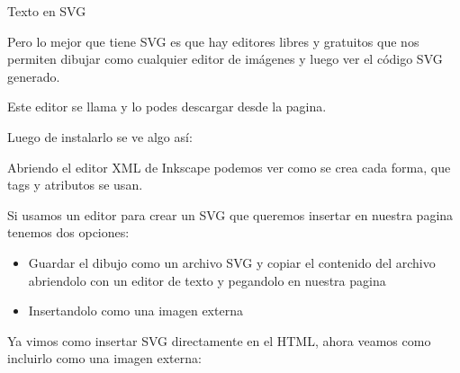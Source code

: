 \documentclass[letterpaper,10pt,spanish]{sphinxmanual}
\begin{document}
\begin{sphinxVerbatim}[commandchars=\\\{\}]
        Texto en SVG
\end{sphinxVerbatim}



Pero lo mejor que tiene SVG es que hay editores libres y gratuitos que nos
permiten dibujar como cualquier editor de imágenes y luego ver el código SVG
generado.

Este editor se llama  y lo podes
descargar desde la pagina.

Luego de instalarlo se ve algo así:

\begin{figure}[htbp]
\centering

\noindent{}
\end{figure}

Abriendo el editor XML de Inkscape podemos ver como se crea cada forma, que
tags y atributos se usan.

\begin{figure}[htbp]
\centering

\noindent{}
\end{figure}

Si usamos un editor para crear un SVG que queremos insertar en nuestra pagina
tenemos dos opciones:
\begin{itemize}
\item {} 
Guardar el dibujo como un archivo SVG y copiar el contenido del archivo abriendolo con un editor de texto y pegandolo en nuestra pagina

\item {} 
Insertandolo como una imagen externa

\end{itemize}

Ya vimos como insertar SVG directamente en el HTML, ahora veamos como incluirlo
como una imagen externa:

%
\begin{sphinxVerbatim}[commandchars=\\\{\}]
   
\end{sphinxVerbatim}
\end{document}
